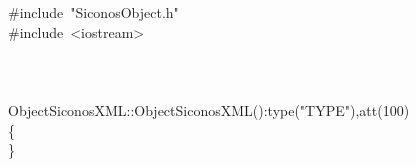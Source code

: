 {\ttfamily \raggedright \small
\ \\
\ \\
\ \\
\ \\
\ \\
\ \\
\ \\
\ \\
\ \\
\ \\
\ \\
\ \\
\ \\
\ \\
\ \\
\ \\
\ \\
\#include\ "{}SiconosObject.h"{}\\
\#include\ <{}iostream>{}\\
\ \\
\ \\
\ \\
ObjectSiconosXML::ObjectSiconosXML():type("{}TYPE"{}),att(100)\\
\{\\
\}\\
\ \\
\ \\
 }
\normalfont\normalsize

